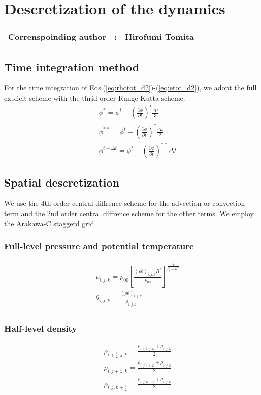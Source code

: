 \chapter{Descretization of the dynamics}
{\bf \Large 
\begin{tabular}{ccc}
\hline
  Correnspoinding author & : & Hirofumi Tomita\\
\hline
\end{tabular}
}

\section{Time integration method}

For the time integration of Eqs.(\ref{eq:rhotot_d2})-(\ref{eq:etot_d2}),
we adopt the full explicit scheme with
the thrid order Runge-Kutta scheme.
\begin{eqnarray}
&&  \phi^{*} = \phi^{t} - \left(\frac{\partial \phi}{\partial t}\right)^{t}\frac{\Delta t}{3}\\
&&  \phi^{**} = \phi^{t} - \left(\frac{\partial \phi}{\partial t}\right)^{*}\frac{\Delta t}{2}\\
&&  \phi^{t+\Delta t} = \phi^{t} - \left(\frac{\partial \phi}{\partial t}\right)^{**} \Delta t
\end{eqnarray}



\section{Spatial descretization}


We use the 4th order central diffrence scheme 
for the advection or convection term
and
the 2nd order central diffrence scheme 
for the other terms.
We employ the Arakawa-C staggerd grid.


\subsection{Full-level pressure and potential temperature}
\begin{eqnarray}
&&p_{i,j,k}=p_{00}\left[\frac{(\rho \theta)_{i,j,k} R^*}{p_{00}} \right]^{\frac{c_{p}^*}{c_{p}^*- R^*}}\\
&&\theta_{i,j,k} = \frac{(\rho \theta)_{i,j,k}}{\rho_{i,j,k}}\\
\end{eqnarray}

\subsection{Half-level density}
\begin{eqnarray}
&&  \overline{\rho}_{i+\frac{1}{2},j,k} = \frac{\rho_{i+1,j,k}+\rho_{i,j,k}}{2}\\
&&  \overline{\rho}_{i,j+\frac{1}{2},k} = \frac{\rho_{i,j+1,k}+\rho_{i,j,k}}{2}\\
&&  \overline{\rho}_{i,j,k+\frac{1}{2}} = \frac{\rho_{i,j,k+1}+\rho_{i,j,k}}{2}\\
\end{eqnarray}

